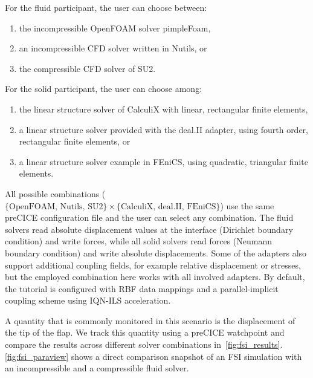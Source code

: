 For the fluid participant, the user can choose between:
\begin{enumerate}
  \item the incompressible OpenFOAM solver pimpleFoam,
  \item an incompressible CFD solver written in Nutils, or
  \item the compressible CFD solver of SU2.
\end{enumerate}

For the solid participant, the user can choose among:
\begin{enumerate}
  \item the linear structure solver of CalculiX with linear, rectangular finite elements,
  \item a linear structure solver provided with the deal.II adapter, using fourth order, rectangular finite elements, or
  \item a linear structure solver example in FEniCS, using quadratic, triangular finite elements.
\end{enumerate}

All possible combinations ($\{\text{OpenFOAM, Nutils, SU2}\} \times \{\text{CalculiX, deal.II, FEniCS}\}$)
use the same preCICE configuration file and the user can select any combination. The fluid solvers read absolute displacement values at the interface (Dirichlet boundary condition) and write forces, while all solid solvers read forces (Neumann boundary condition) and write absolute displacements.
Some of the adapters also support additional coupling fields, for example relative displacement or stresses, but the employed combination here works with all involved adapters. By default, the tutorial is configured with RBF data mappings and a parallel-implicit coupling scheme using IQN-ILS acceleration.

A quantity that is commonly monitored in this scenario is the displacement of the tip of the flap. We track this quantity using a preCICE watchpoint and compare the results across different solver combinations in~\autoref{fig:fsi_results}. \autoref{fig:fsi_paraview} shows a direct comparison snapshot of an FSI simulation with an incompressible and a compressible fluid solver.




